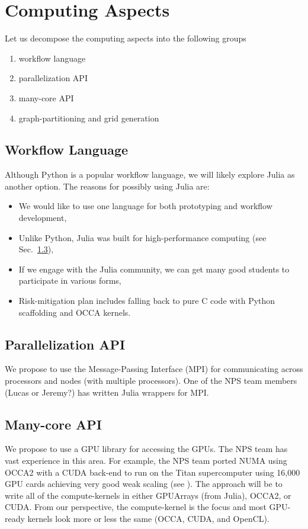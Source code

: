 
\section{Computing Aspects}
\label{sec:computing_aspects}

Let us decompose the computing aspects into the following groups
\begin{enumerate}
\item workflow language
\item parallelization API
\item many-core API
\item graph-partitioning and grid generation

\end{enumerate}

\subsection{Workflow Language}
Although Python is a popular workflow language, we will likely explore Julia as another option.  The reasons for possibly using Julia are: 
\begin{itemize}
\item We would like to use one language for both prototyping and workflow development,
\item Unlike Python, Julia was built for high-performance computing (see Sec.\ \ref{sec:computing_aspects/manycore}),
\item If we engage with the Julia community, we can get many good students to participate in various forms,
\item Risk-mitigation plan includes falling back to pure C code with Python scaffolding and OCCA kernels.
\end{itemize} 

\subsection{Parallelization API}
We propose to use the Message-Passing Interface (MPI) for communicating across processors and nodes (with multiple processors).  One of the NPS team members (Lucas or Jeremy?) has written Julia wrappers for MPI.

\subsection{Many-core API}
\label{sec:computing_aspects/manycore}
We propose to use a GPU library for accessing the GPUs. The NPS team has vast experience in this area. For example, the NPS team ported NUMA using OCCA2 with a CUDA back-end to run on the Titan supercomputer using 16,000 GPU cards achieving very good weak scaling (see \cite{abdi:2016b,abdi:2018}). The approach will be to write all of the compute-kernels in either GPUArrays (from Julia), OCCA2, or CUDA. From our perspective, the compute-kernel is the focus and most GPU-ready kernels look more or less the same (OCCA, CUDA, and OpenCL). 

